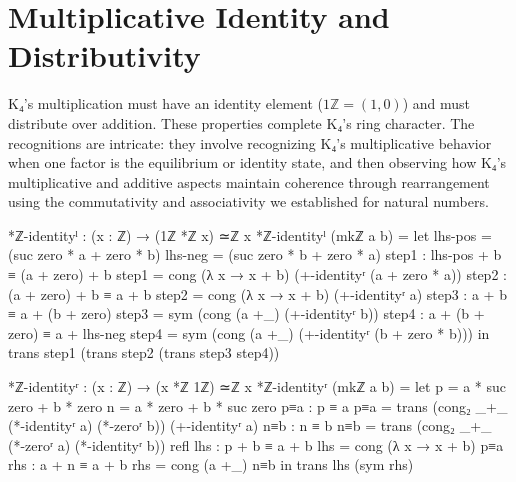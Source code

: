 \documentclass[11pt,a4paper]{book}
\begin{document}
\section{Multiplicative Identity and Distributivity}

K₄'s multiplication must have an identity element ($1\mathbb{Z} = (1,0)$) and must distribute over addition. These properties complete K₄'s ring character. The recognitions are intricate: they involve recognizing K₄'s multiplicative behavior when one factor is the equilibrium or identity state, and then observing how K₄'s multiplicative and additive aspects maintain coherence through rearrangement using the commutativity and associativity we established for natural numbers.

\begin{code}
*ℤ-identityˡ : (x : ℤ) → (1ℤ *ℤ x) ≃ℤ x
*ℤ-identityˡ (mkℤ a b) = 
  let lhs-pos = (suc zero * a + zero * b)
      lhs-neg = (suc zero * b + zero * a)
      step1 : lhs-pos + b ≡ (a + zero) + b
      step1 = cong (λ x → x + b) (+-identityʳ (a + zero * a))
      step2 : (a + zero) + b ≡ a + b
      step2 = cong (λ x → x + b) (+-identityʳ a)
      step3 : a + b ≡ a + (b + zero)
      step3 = sym (cong (a +_) (+-identityʳ b))
      step4 : a + (b + zero) ≡ a + lhs-neg
      step4 = sym (cong (a +_) (+-identityʳ (b + zero * b)))
  in trans step1 (trans step2 (trans step3 step4))

*ℤ-identityʳ : (x : ℤ) → (x *ℤ 1ℤ) ≃ℤ x
*ℤ-identityʳ (mkℤ a b) = 
  let p = a * suc zero + b * zero
      n = a * zero + b * suc zero
      p≡a : p ≡ a
      p≡a = trans (cong₂ _+_ (*-identityʳ a) (*-zeroʳ b)) (+-identityʳ a)
      n≡b : n ≡ b
      n≡b = trans (cong₂ _+_ (*-zeroʳ a) (*-identityʳ b)) refl
      lhs : p + b ≡ a + b
      lhs = cong (λ x → x + b) p≡a
      rhs : a + n ≡ a + b
      rhs = cong (a +_) n≡b
  in trans lhs (sym rhs)


\end{code}
\end{document}

